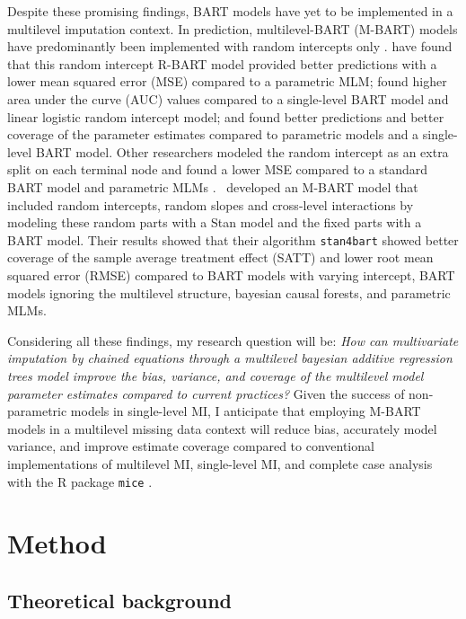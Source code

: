 \documentclass[3p,12pt,a4paper]{elsarticle}
\begin{document}
Despite these promising findings, BART models have yet to be implemented in a multilevel imputation context. In prediction, multilevel-BART (M-BART) models have predominantly been implemented with random intercepts only \citep{chen2020, wagner2020, tan2016, wundervald2022}. \citet{wagner2020} have found that this random intercept R-BART model provided better predictions with a lower mean squared error (MSE) compared to a parametric MLM; \citet{tan2016} found higher area under the curve (AUC) values compared to a single-level BART model and linear logistic random intercept model; and \citet{chen2020} found better predictions and better coverage of the parameter estimates compared to parametric models and a single-level BART model. Other researchers modeled the random intercept as an extra split on each terminal node and found a lower MSE compared to a standard BART model and parametric MLMs \citep{wundervald2022}.~\citet{dorie2022} developed an M-BART model that included random intercepts, random slopes and cross-level interactions by modeling these random parts with a Stan \citep{lee2017} model and the fixed parts with a BART model. Their results showed that their algorithm \texttt{stan4bart} showed better coverage of the sample average treatment effect (SATT) and lower root mean squared error (RMSE) compared to BART models with varying intercept, BART models ignoring the multilevel structure, bayesian causal forests, and parametric MLMs.

Considering all these findings, my research question will be: \textit{How can multivariate imputation by chained equations through a multilevel bayesian additive regression trees model improve the bias, variance, and coverage of the multilevel model parameter estimates compared to current practices?} Given the success of non-parametric models in single-level MI, I anticipate that employing M-BART models in a multilevel missing data context will reduce bias, accurately model variance, and improve estimate coverage compared to conventional implementations of multilevel MI, single-level MI, and complete case analysis with the R package \texttt{mice} \citep{buuren2011}. 

\section{Method}
\subsection{Theoretical background}
\end{document}
